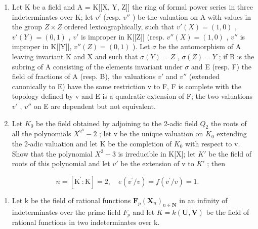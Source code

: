 
\begin{enumerate}
\def\labelenumi{\arabic{enumi}.}
\item
  Let K be a field and A = K{[}{[}X, Y, Z{]}{]} the ring of formal power series in three indeterminates over K; let \(v'\) (resp. \(v''\) ) be the valuation on A with values in the group \(Z \times Z\) ordered lexicographically, such that \(v'(X) = (1, 0)\) , \(v'(Y) = (0, 1)\) , \(v'\) is improper in K{[}{[}Z{]}{]} (resp. \(v''(X) = (1, 0)\) , \(v''\) is improper in K{[}{[}Y{]}{]}, \(v''(Z) = (0, 1)\) ). Let \(\sigma\) be the automorphism of A leaving invariant K and X and such that \(\sigma(Y) = Z\) , \(\sigma(Z) = Y\) ; if B is the subring of A consisting of the elements invariant under \(\sigma\) and E (resp. F) the field of fractions of A (resp. B), the valuations \(v'\) and \(v''\) (extended canonically to E) have the same restriction v to F, F is complete with the topology defined by v and E is a quadratic extension of F; the two valuations \(v'\) , \(v''\) on E are dependent but not equivalent.
\item
  Let \(K_{0}\) be the field obtained by adjoining to the 2-adic field \(Q_{2}\) the roots of all the polynomials \(X^{2^{n}} - 2\) ; let v be the unique valuation on \(K_{0}\) extending the 2-adic valuation and let K be the completion of \(K_{0}\) with respect to v. Show that the polynomial \(X^{2} - 3\) is irreducible in K{[}X{]}; let \(K'\) be the field of roots of this polynomial and let \(v'\) be the extension of v to \(K'\) ; then
\end{enumerate}

\[
n = \left[ \mathrm{K} ^ {\prime}: \mathrm{K} \right] = 2, \quad e (v ^ {\prime} / v) = f (v ^ {\prime} / v) = 1.
\]

\begin{enumerate}
\def\labelenumi{\arabic{enumi}.}
\setcounter{enumi}{2}
\tightlist
\item
  Let k be the field of rational functions \(\mathbf{F}_{p}(\mathbf{X}_{n})_{n\in\mathbf{N}}\) in an infinity of indeterminates over the prime field \(F_{p}\) and let \(K = k(\mathbf{U}, \mathbf{V})\) be the field of rational functions in two indeterminates over k.
\end{enumerate}


